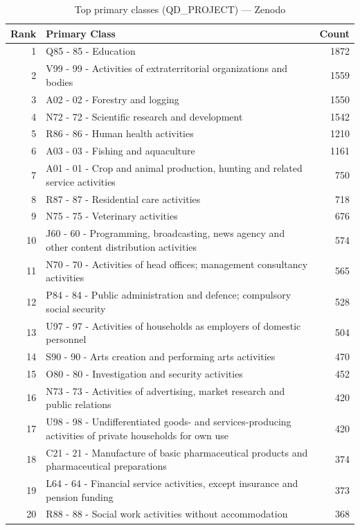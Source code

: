 \begin{table}[H]
    \centering
    \begin{tabular}{r p{10cm} r}
    \hline
    \textbf{Rank} & \textbf{Primary Class} & \textbf{Count} \\
    \hline
    1 & Q85 - 85 - Education & 1872 \\
    2 & V99 - 99 - Activities of extraterritorial organizations and bodies & 1559 \\
    3 & A02 - 02 - Forestry and logging & 1550 \\
    4 & N72 - 72 - Scientific research and development & 1542 \\
    5 & R86 - 86 - Human health activities & 1210 \\
    6 & A03 - 03 - Fishing and aquaculture & 1161 \\
    7 & A01 - 01 - Crop and animal production, hunting and related service activities & 750 \\
    8 & R87 - 87 - Residential care activities & 718 \\
    9 & N75 - 75 - Veterinary activities & 676 \\
    10 & J60 - 60 - Programming, broadcasting, news agency and other content distribution activities & 574 \\
    11 & N70 - 70 - Activities of head offices; management consultancy activities & 565 \\
    12 & P84 - 84 - Public administration and defence; compulsory social security & 528 \\
    13 & U97 - 97 - Activities of households as employers of domestic personnel & 504 \\
    14 & S90 - 90 - Arts creation and performing arts activities & 470 \\
    15 & O80 - 80 - Investigation and security activities & 452 \\
    16 & N73 - 73 - Activities of advertising, market research and public relations & 420 \\
    17 & U98 - 98 - Undifferentiated goods- and services-producing activities of private households for own use & 420 \\
    18 & C21 - 21 - Manufacture of basic pharmaceutical products and pharmaceutical preparations & 374 \\
    19 & L64 - 64 - Financial service activities, except insurance and pension funding & 373 \\
    20 & R88 - 88 - Social work activities without accommodation & 368 \\
    \hline
    \end{tabular}
    \caption{Top primary classes (QD\_PROJECT) --- Zenodo}
\end{table}


